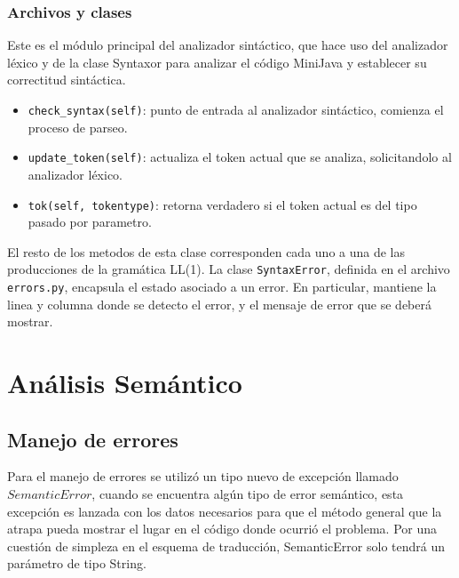 \documentclass [a4paper,abstracton,titlepage]{scrartcl}
\begin{document}
\subsubsection{Archivos y clases}
\label{_archivos_y_clases}
\hypertarget{_archivo_texttt_syntaxor___main_py}{}
\label{_archivo_texttt_syntaxor___main_py}
Este es el módulo principal del analizador sintáctico, que hace uso del
analizador léxico y de la clase Syntaxor para analizar el código MiniJava
y establecer su correctitud sintáctica.
\hypertarget{_clase_syntaxor}{}
\label{_clase_syntaxor}
  \begin{itemize}
\item%
\texttt{check\_{}syntax(self)}: punto de entrada al analizador sintáctico, comienza el proceso de parseo.

\item%
\texttt{update\_{}token(self)}: actualiza el token actual que se analiza, solicitandolo al analizador léxico.

\item%
\texttt{tok(self, tokentype)}: retorna verdadero si el token actual es del tipo pasado por parametro.

\end{itemize}
El resto de los metodos de esta clase corresponden cada uno a una de las
producciones de la gramática LL(1).
\hypertarget{_clase_syntaxerror}{}
\label{_clase_syntaxerror}
La clase \texttt{SyntaxError}, definida en el archivo \texttt{errors.py}, encapsula el estado asociado a un error.
En particular, mantiene la linea y columna donde se detecto el error, y el mensaje de error que se deberá mostrar.

\section{Análisis Semántico}

\subsection{Manejo de errores}

Para el manejo de errores se utilizó un tipo nuevo de excepción llamado
$SemanticError$, cuando se encuentra algún tipo de error semántico, esta
excepción es lanzada con los datos necesarios para que el método general que la
atrapa pueda mostrar el lugar en el código donde ocurrió el problema. Por una
cuestión de simpleza en el esquema de traducción, SemanticError solo tendrá un
parámetro de tipo String.
\end{document}
